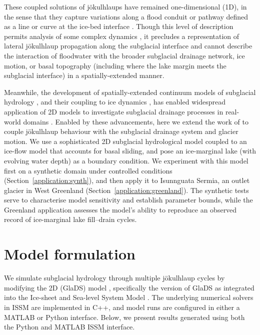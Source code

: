 \documentclass[tc, manuscript]{copernicus}
\begin{document}
These coupled solutions of jökulhlaups have remained one-dimensional (1D), in the sense that they capture variations along a flood conduit or pathway defined as a line or curve at the ice-bed interface \citep[e.g.,][]{fowler1999breaking,kingslake2013modelling}. Though this level of description permits analysis of some complex dynamics \citep{kingslake2015chaotic,stubblefield2019modeling,schoof2020analysis}, it precludes a representation of lateral jökulhlaup propagation along the subglacial interface \citep{kingslake2013modelling} and cannot describe the interaction of floodwater with the broader subglacial drainage network, ice motion, or basal topography (including where the lake margin meets the subglacial interface) in a spatially-extended manner. 

Meanwhile, the development of spatially-extended continuum models of subglacial hydrology \citep[e.g.,][]{werder2013modeling,sommers2018shakti}, and their coupling to ice dynamics \citep{gilbert2022consistent,cook2022fully,pelle2024subglacial}, has enabled widespread application of 2D models to investigate subglacial drainage processes in real-world domains \citep[e.g.,][]{dow2019role,ehrenfeucht2023seasonal,ehrenfeucht2025Antarctic,narayanan2025simulating}. Enabled by these advancements, here we extend the work of \citet{kingslake2013modelling} to couple jökulhlaup behaviour with the subglacial drainage system and glacier motion. We use a sophisticated 2D subglacial hydrological model coupled to an ice-flow model that accounts for basal sliding, and pose an ice-marginal lake (with evolving water depth) as a boundary condition. We experiment with this model first on a synthetic domain under controlled conditions (Section~\ref{application:synth}), and then apply it to Isunnguata Sermia, an outlet glacier in West Greenland (Section~\ref{application:greenland}). The synthetic tests serve to characterise model sensitivity and establish parameter bounds, while the Greenland application assesses the model's ability to reproduce an observed record of ice-marginal lake fill--drain cycles.

\section{Model formulation}
We simulate subglacial hydrology through multiple jökulhlaup cycles by modifying the 2D  (GlaDS) model \citep{werder2013modeling}, specifically the version of GlaDS as integrated into the Ice-sheet and Sea-level System Model \citep[ISSM commit a9a3804;][]{larour2012continental}. The underlying numerical solvers in ISSM are implemented in C++, and model runs are configured in either a MATLAB or Python interface. Below, we present results generated using both the Python and MATLAB ISSM interface. 
\end{document}
